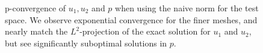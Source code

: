 \begin{figure}[h!b!p!]
{}
\caption{p-convergence of $u_{1},u_{2}$ and $p$ when using the naive norm for the test space.  We observe exponential convergence for the finer meshes, and nearly match the $L^{2}$-projection of the exact solution for $u_{1}$ and $u_{2}$, but see significantly suboptimal solutions in $p$.
}
\label{fig:naive_p}
\end{figure}

